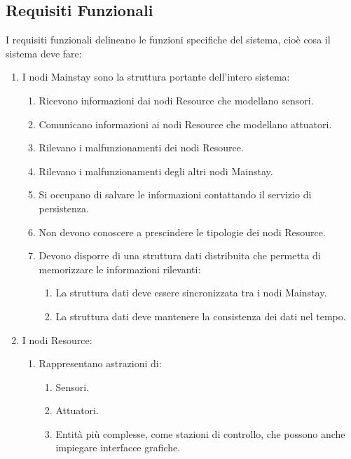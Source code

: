 \documentclass{scrartcl}
\begin{document}
\subsection{Requisiti Funzionali}
I requisiti funzionali delineano le funzioni specifiche del sistema, cioè cosa il sistema deve fare:
\begin{enumerate}
    \item I nodi Mainstay sono la struttura portante dell'intero sistema:
          \begin{enumerate}
              \item Ricevono informazioni dai nodi Resource che modellano sensori.
              \item Comunicano informazioni ai nodi Resource che modellano attuatori.
              \item Rilevano i malfunzionamenti dei nodi Resource.
              \item Rilevano i malfunzionamenti degli altri nodi Mainstay.
              \item Si occupano di salvare le informazioni contattando il servizio di persistenza.
              \item Non devono conoscere a prescindere le tipologie dei nodi Resource.
              \item Devono disporre di una struttura dati distribuita che permetta di memorizzare le informazioni rilevanti:
                    \begin{enumerate}
                        \item La struttura dati deve essere sincronizzata tra i nodi Mainstay.
                        \item La struttura dati deve mantenere la consistenza dei dati nel tempo.
                    \end{enumerate}
          \end{enumerate}
    \item I nodi Resource:
          \begin{enumerate}
              \item Rappresentano astrazioni di:
                    \begin{enumerate}
                        \item Sensori.
                        \item Attuatori.
                        \item Entità più complesse, come stazioni di controllo, che possono anche impiegare interfacce grafiche.
                    \end{enumerate}

\end{enumerate}
\end{enumerate}
\end{document}
